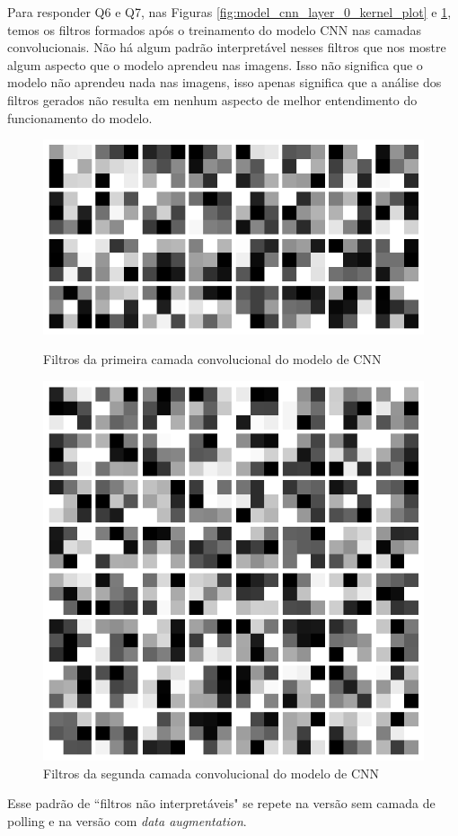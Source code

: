 \documentclass[12pt]{article}
\begin{document}
Para responder Q6 e Q7, nas Figuras \ref{fig:model_cnn_layer_0_kernel_plot} e \ref{fig:model_cnn_layer_1_kernel_plot}, temos os filtros formados após o treinamento do modelo CNN nas camadas convolucionais. Não há algum padrão interpretável nesses filtros que nos mostre algum aspecto que o modelo aprendeu nas imagens. Isso não significa que o modelo não aprendeu nada nas imagens, isso apenas significa que a análise dos filtros gerados não resulta em nenhum aspecto de melhor entendimento do funcionamento do modelo.  


\begin{figure}[H]
  \centering
  \begin{minipage}{0.5\textwidth}
    \centering
    \includegraphics[width=.5\textwidth]{../images/kernels_plt/model_cnn_layer_0_kernel_plot.png}
    \caption{Filtros da primeira camada convolucional do modelo de CNN}
    \label{fig:model_cnn_layer_0_kernel_plot}
  \end{minipage}%
  \hfill
  \begin{minipage}{0.5\textwidth}
    \centering
    \includegraphics[width=.5\textwidth]{../images/kernels_plt/model_cnn_layer_1_kernel_plot.png}
    \caption{Filtros da segunda camada convolucional do modelo de CNN}
    \label{fig:model_cnn_layer_1_kernel_plot}
  \end{minipage}
  \end{figure}

  Esse padrão de ``filtros não interpretáveis" se repete  na versão sem camada de polling e na versão com \textit{data augmentation}.
\end{document}
